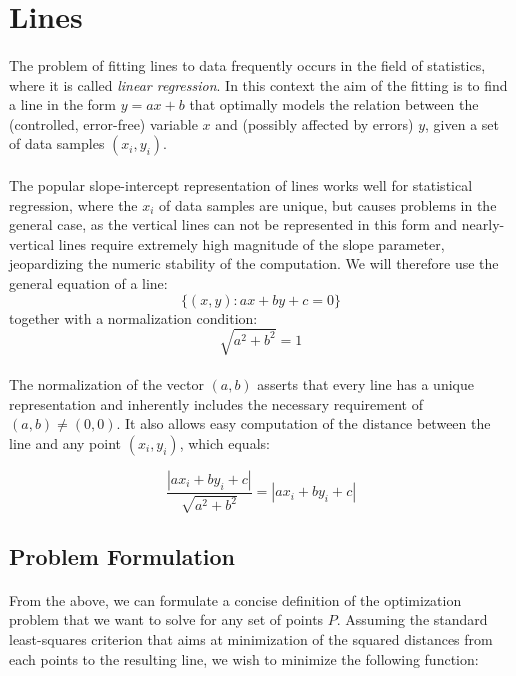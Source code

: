 \section{Lines}

\paragraph*{}
The problem of fitting lines to data frequently occurs in the field of statistics, where it is called \textit{linear regression}. In this context the aim of the fitting is to find a line in the form $y = ax + b$ that optimally models the relation between the (controlled, error-free) variable $x$ and (possibly affected by errors) $y$, given a set of data samples $(x_i, y_i)$. 

\paragraph*{}
The popular slope-intercept representation of lines works well for statistical regression, where the $x_i$ of data samples are unique, but causes problems in the general case, as the vertical lines can not be represented in this form and nearly-vertical lines require extremely high magnitude of the slope parameter, jeopardizing the numeric stability of the computation. We will therefore use the general equation of a line:
\[
	\{(x,y): ax + by + c = 0\}
\]
together with a normalization condition:
\[
	\sqrt{a^2 + b^2} = 1 
\]

\paragraph*{}
The normalization of the vector $(a,b)$ asserts that every line has a unique representation and inherently includes the necessary requirement of $(a,b) \neq (0,0)$. It also allows easy computation of the distance between the line and any point $(x_i,y_i)$, which equals:

\[
	\frac{|ax_i + by_i + c|}{\sqrt{a^2 + b^2}} = |ax_i + by_i + c|
\]

\subsection{Problem Formulation}

\paragraph*{}
From the above, we can formulate a concise definition of the optimization problem that we want to solve for any set of points $P$. Assuming the standard least-squares criterion that aims at minimization of the squared distances from each points to the resulting line, we wish to minimize the following function:

